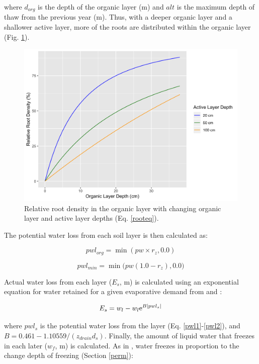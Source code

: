 \documentclass[a4paper, 12pt] {report}
\begin{document}
where $d_{org}$ is the depth of the organic layer (m) and $alt$ is the maximum depth of thaw from the previous year (m). Thus, with a deeper organic layer and a shallower active layer, more of the roots are distributed within the organic layer (Fig. \ref{fig:roots}).

\begin{figure}
  \includegraphics[width=0.8\linewidth]{Figures/RootDens.png}
  \caption{Relative root density in the organic layer with changing organic layer and active layer depths (Eq. \ref{rooteq}).}
  \label{fig:roots}
\end{figure}

The potential water loss from each soil layer is then calculated as:

\begin{equation} \label{pwl1}
pwl_{org} = \min(pw \times r_z, 0.0)
\end{equation}

\begin{equation} \label{pwl2}
pwl_{min} = \min\Big(pw(1.0 - r_z), 0.0\Big)
\end{equation}

Actual water loss from each layer ($E_s$, m) is calculated using an exponential equation for water retained for a given evaporative demand from  and :

\begin{equation}
E_s= w_l - w_l{\rm e}^{B|pwl_s|}
\end{equation}

where $pwl_s$ is the potential water loss from the layer (Eq. \ref{pwl1}-\ref{pwl2}), and $B = 0.461 - 1.10559/(z_{drain}d_s)$. Finally, the amount of liquid water that freezes in each later ($w_f$, m) is calculated. As in , water freezes in proportion to the change depth of freezing (Section \ref{perm}):
\end{document}
